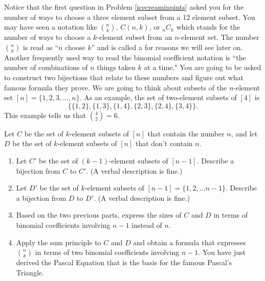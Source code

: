 Notice that the first question in Problem \ref{icecreaminpints} asked
you for the number of ways to choose a three element subset from a 12
element subset.  You may have seen a notation like
$n\choose k$, $C(n,k)$, or $_nC_k$ which stands for the number of ways to
choose a
$k$-element subset from an
$n$-element set.  The number $n\choose k$ is read as ``$n$ choose $k$'' and is
called a
  for
reasons we will see later on.  Another frequently used  way to read the
binomial coefficient notation  is ``the number of combinations
 of
$n$ things taken $k$ at a time." You are going to be asked to construct
two bijections that relate to these numbers and figure out what famous
formula they prove.  We are going to think about subsets of the
$n$-element set $[n] =
\{1,2,3,\ldots, n\}$. As an example, the set of two-element subsets of
$[4]$ is
$$\{\{1,2\}, \{1,3\}, \{1,4\}, \{2,3\}, \{2,4\}, \{3,4\}\}.$$  This
example tells us that ${4\choose 2} = 6$. 

\bp
\iteme Let
$C$ be the set of $k$-element subsets of $[n]$ that contain
the number
$n$, and let
$D$ be the set of $k$-element subsets of $[n]$ that don't
contain $n$.  
\begin{enumerate} 
\item Let $C'$ be the set of $(k-1)$-element subsets of
$[n-1]$.  Describe a bijection from $C$ to $C'$.  (A verbal
description is fine.)
\item Let $D'$ be the set of $k$-element subsets of
$[n-1]=\{1,2,\ldots n-1\}$.  Describe a bijection from $D$ to
$D'$. (A verbal description is fine.)
\item Based on the two previous parts, express the sizes of
$C$ and $D$ in terms of binomial coefficients involving $n-1$
instead of $n$.
\item Apply the sum principle to $C$ and $D$ and obtain a
formula that expresses $n\choose k$ in terms of two binomial
coefficients involving
$n-1$.  You have just derived the Pascal Equation that is the
basis for the famous Pascal's Triangle.
\end{enumerate}\label{Pascal} 

